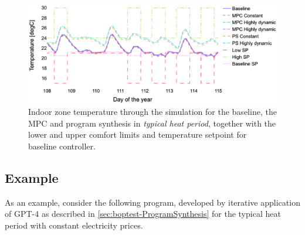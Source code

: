 \begin{figure}
  \includegraphics[scale=.4]{images/boptest/Fig7.eps}
\caption{Indoor zone temperature through the simulation for the baseline, the MPC and program synthesis in \emph{typical heat period}, together with the lower and upper comfort limits and temperature setpoint for baseline controller.}
\label{fig:temp-typical}       %
\end{figure}

\newpage
\subsection{Example}


As an example, consider the following program, developed by iterative application of GPT-4 as described in \ref{sec:boptest-ProgramSynthesis} for the typical heat period with constant electricity prices.

